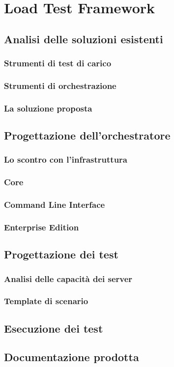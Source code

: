 
\chapter{Load Test Framework}
\label{cap:descrizione-stage}
\section{Analisi delle soluzioni esistenti}
\subsection{Strumenti di test di carico}
\subsection{Strumenti di orchestrazione}
\subsection{La soluzione proposta}
\section{Progettazione dell'orchestratore}
\subsection{Lo scontro con l'infrastruttura}
\subsection{Core}
\subsection{Command Line Interface}
\subsection{Enterprise Edition}
\section{Progettazione dei test}
\subsection{Analisi delle capacità dei server}
\subsection{Template di scenario}
\section{Esecuzione dei test}
\section{Documentazione prodotta}